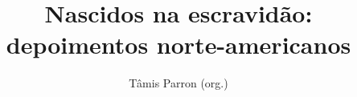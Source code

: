 \documentclass[11pt]{extarticle}
\begin{document}
\newcommand{\AutorLivro}{Tâmis Parron (org.)}
\newcommand{\TituloLivro}{Nascidos na escravidão: depoimentos norte-americanos}
\newcommand{\Tema}{Diálogos com a sociologia e com a antropologia}
\newcommand{\Genero}{Diário; biografia; autobiografia; relatos; memórias}
\newcommand{\imagemCapa}{./images/PNLD0007-01.png}
\newcommand{\issnppub}{978-65-89705-03-1}
\newcommand{\issnepub}{978-65-89705-00-0}
\newcommand{\colaborador}{Eduardo Modesto de Carvalho, 
      Bruno Gradella e Vicente Castro}


\title{\TituloLivro}
\author{\AutorLivro}
\def\authornotes{\colaborador}

\date{}
\maketitle
\end{document}
